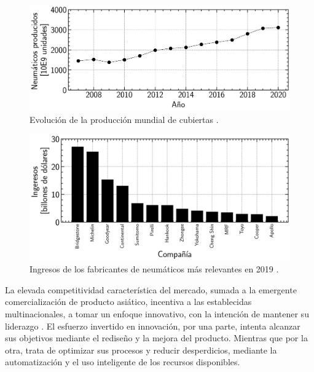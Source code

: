 \begin{figure}[h]
	\begin{center}
		\includegraphics[width=\textwidth]{fig/1_global_prod_evo.PNG}
	\end{center}
	\caption{Evolución de la producción mundial de cubiertas \citep{rodgers2020tire}.}
	\label{fig:1_global_prod_evo}
\end{figure}

 \begin{figure}[h]
	\begin{center}
		\includegraphics[width=\textwidth]{fig/1_brand.revenue.PNG}
	\end{center}
	\caption{Ingresos de los fabricantes de neumáticos más relevantes en 2019 \citep{rodgers2020tire}.}
	\label{fig:1_brand_revenue}
\end{figure}

La elevada competitividad característica del mercado,
sumada a la emergente comercialización de producto asiático,
incentiva a las establecidas multinacionales, a tomar un enfoque innovativo,
con la intención de mantener su liderazgo \citep{chicu2020current}.
El esfuerzo invertido en innovación,
por una parte, intenta alcanzar sus objetivos
mediante el rediseño y la mejora del producto.
Mientras que por la otra,
trata de optimizar sus procesos y reducir desperdicios,
mediante la automatización y el uso inteligente de los recursos disponibles.

